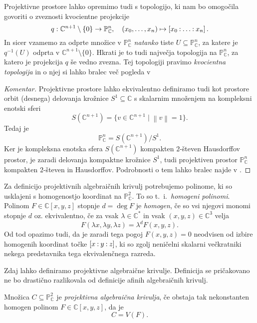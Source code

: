 \documentclass[mat1]{fmfdelo}
\numberwithin{equation}{section}
\newcommand{\C}{\mathbb C}
\newcommand{\PP}{\mathbb P}
\newcommand{\CM}{\mathbb C ^*}
\newcommand{\PC}{\mathbb{P}^2_\C}
\newcommand{\inv}{^{-1}}
\newcommand{\pcoor}[1]{%
\begingroup\lccode`~=`: \lowercase{\endgroup
\edef~}{\mathbin{\mathchar\the\mathcode`:}\nobreak}%
\left[%
\begingroup
\mathcode`:=\string"8000
#1%
\endgroup
\right]%
}
\theoremstyle{definition}
\newenvironment{komentar}[1][Komentar]{\begin{proof}[#1]\let\qed\relax}{\end{proof}}
\begin{document}
\begin{opomba} 
    \label{topologija na projektivnih prostorih}   
    Projektivne prostore lahko opremimo tudi s topologijo, ki nam bo omogočila govoriti o zveznosti kvocientne projekcije
    \[
        q : \C^{n+1}\setminus\{0\} \to \PP_\C^n, \quad (x_0, \ldots, x_n) \mapsto \pcoor{x_0 : \ldots : x_n}. 
    \]
    In sicer vzamemo za odprte množice v $\PP_\C^n$ \emph{natanko} tiste $U \subseteq \PP_\C^n$, za katere je $q\inv(U)$ odprta v $\C^{n+1}\setminus\{0\}$. Hkrati je to tudi največja topologija na $\PP_\C^n$, za katero je projekcija $q$ še vedno zvezna.  
    Tej topologiji pravimo \emph{kvocientna topologija} in o njej si lahko bralec več pogleda v \cite[poglavje 3.2.]{MrcunTop}
\end{opomba}

\begin{komentar}
    Projektivne prostore lahko ekvivalentno definiramo tudi kot prostore orbit (desnega) delovanja krožnice $S^1 \subseteq \C$ s skalarnim množenjem na kompleksni enotski sferi 
    \[
        S(\C^{n+1}) = \{v \in \C^{n+1} \mid \left\lVert v\right\rVert = 1\}.
    \]
    Tedaj je
    \[
        \PP_\C^n = S(\C^{n+1})/S^1.
    \]
    Ker je kompleksna enotska sfera $S(\C^{n+1})$ kompakten $2$-števen Hausdorffov prostor, je zaradi delovanja kompaktne krožnice $S^1$, tudi projektiven prostor $\PP_\C^n$ kompakten $2$-števen in Hausdorffov. Podrobnosti o tem lahko bralec najde v 
    \cite[Zgled 3.43. (2)]{MrcunTop}.
\end{komentar}

Za definicijo projektivnih algebraičnih krivulj potrebujemo  polinome, ki so usklajeni s homogenostjo koordinat na $\PC$. To so t.~i.\ \emph{homogeni polinomi}. Polinom $F \in \C[x,y,z]$ stopnje $d = \deg F$ je \emph{homogen}, če so vsi njegovi monomi stopnje $d$ oz. ekvivalentno, če za vsak $\lambda \in \CM$ in vsak $(x,y,z) \in \C^3$ velja
\[
    F(\lambda x, \lambda y, \lambda z) = \lambda^d F(x,y,z). 
\]
Od tod opazimo tudi, da je zaradi tega pogoj $F(x,y,z) = 0$ neodvisen od izbire homogenih koordinat točke $\pcoor{x : y : z}$, ki so zgolj neničelni skalarni večkratniki nekega predstavnika tega ekvivalenčnega razreda.  

Zdaj lahko definiramo projektivne algebraične krivulje. Definicija se pričakovano ne bo drastično razlikovala od definicije afinih algebraičnih krivulj.

\begin{definicija}
    Množica $C \subseteq \PC$ je \emph{projektivna algebraična krivulja}, če obstaja tak nekonstanten homogen polinom $F \in \C[x,y,z]$, da je
    \[
        C = V(F). 
    \]
\end{definicija}
\end{document}
